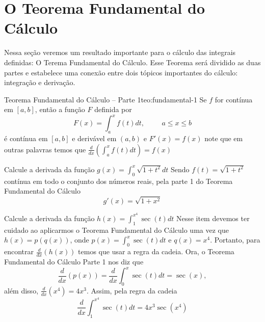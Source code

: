 \section{O Teorema Fundamental do Cálculo}

Nessa seção veremos um resultado importante para o cálculo das integrais
definidas: O Terema Fundamental do Cálculo. Esse Teorema será dividido as duas
partes e estabelece uma conexão entre dois tópicos importantes do cálculo:
integração e derivação.

\begin{teorema}{Teorema Fundamental do Cálculo -- Parte 1}{teo:fundamental-1}
  Se $f$ for contínua em $[a,b]$, então a função $F$ definida por
  $$F(x)= \int_a^x f(t)dt, \hspace{1cm} a \leq x \leq b$$
  é contínua em $[a,b]$ e derivável em $(a,b)$ e $F'(x)=f(x)$
  note que em outras palavras temos que
  $\frac{d}{dx} \left( \int_a^x f(t)dt \right)=f(x)$
\end{teorema}

\begin{example}
  Calcule a derivada da função \(g(x)=\int_0^x \sqrt{1+t^2} dt\)
  \solution
  Sendo $f(t)= \sqrt{1+t^2}$ contínua em todo o conjunto dos números reais,
  pela parte 1 do Teorema Fundamental do Cálculo
  \[
  g'(x)=\sqrt{1+x^2}
  \]
\end{example}

\begin{example}
  Calcule a derivada da função \(h(x)=\int_1^{x^4} \sec(t)dt\)
  \solution
  Nesse item devemos ter cuidado ao aplicarmos o Teorema Fundamental do
  Cálculo uma vez que $h(x)=p(q(x))$, onde
  \(p(x)=\int_0^x \sec(t)dt\) e $q(x)= x^4$.
  Portanto, para encontrar $\frac{d}{dx}(h(x))$ temos que usar a regra da
  cadeia. Ora, o Teorema Fundamental do Cálculo Parte 1 nos diz que
  \[
  \frac{d}{dx}(p(x))= \frac{d}{dx} \int_0^x \sec(t)dt= \sec(x),
  \]
  além disso, $\frac{d}{dx}(x^4)= 4x^3$. Assim, pela regra da cadeia
  \[
  \frac{d}{dx}\int_1^{x^4} \sec(t)dt= 4x^3\sec(x^4)
  \]
\end{example}

